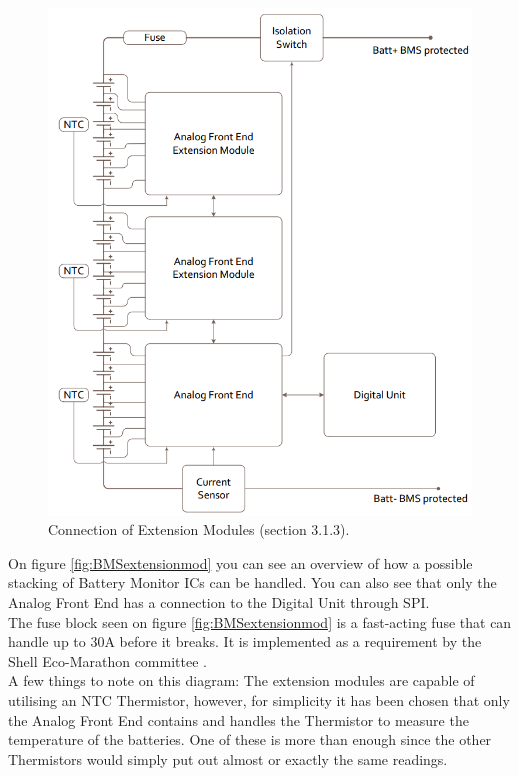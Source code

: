 \begin{figure}[H]
	\centering
	\includegraphics[width=1.0\linewidth]{Hardware/Pictures/BMSextensionmod}
	\caption[Empty]{Connection of Extension Modules \cite{BMSDocumentation} (section 3.1.3).}
	\label{fig:BMSextensionmod}
\end{figure}

On figure \vref{fig:BMSextensionmod} you can see an overview of how a possible stacking of Battery Monitor ICs can be handled. You can also see that only the Analog Front End has a connection to the Digital Unit through SPI.\\
The fuse block seen on figure \vref{fig:BMSextensionmod} is a fast-acting fuse that can handle up to 30A before it breaks. It is implemented as a requirement by the Shell Eco-Marathon committee \cite{ShellRequirements}.\\
A few things to note on this diagram: The extension modules are capable of utilising an NTC Thermistor, however, for simplicity it has been chosen that only the Analog Front End contains and handles the Thermistor to measure the temperature of the batteries. One of these is more than enough since the other Thermistors would simply put out almost or exactly the same readings.

